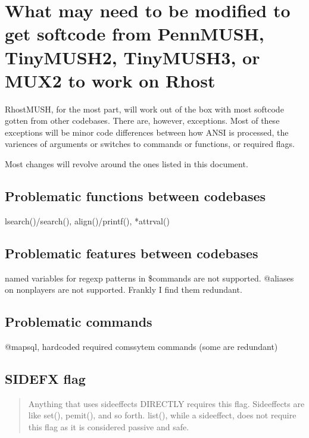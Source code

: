 \documentclass[letterpaper,10pt,english]{sphinxmanual}
\begin{document}
\section{What may need to be modified to get softcode from PennMUSH, TinyMUSH2, TinyMUSH3, or MUX2 to work on Rhost}
\label{\detokenize{differences:what-may-need-to-be-modified-to-get-softcode-from-pennmush-tinymush2-tinymush3-or-mux2-to-work-on-rhost}}
\sphinxAtStartPar
RhostMUSH, for the most part, will work out of the box with most softcode gotten
from other codebases.  There are, however, exceptions.  Most of these exceptions
will be minor code differences between how ANSI is processed, the variences
of arguments or switches to commands or functions, or required flags.

\sphinxAtStartPar
Most changes will revolve around the ones listed in this document.


\subsection{Problematic functions between codebases}
\label{\detokenize{differences:problematic-functions-between-codebases}}
\sphinxAtStartPar
lsearch()/search(), align()/printf(), *attrval()


\subsection{Problematic features between codebases}
\label{\detokenize{differences:problematic-features-between-codebases}}
\sphinxAtStartPar
named variables for regexp patterns in \$commands are not supported.
@aliases on non\sphinxhyphen{}players are not supported.  Frankly I find them redundant.


\subsection{Problematic commands}
\label{\detokenize{differences:problematic-commands}}
\sphinxAtStartPar
@mapsql, hardcoded required comssytem commands (some are redundant)


\subsection{SIDEFX flag}
\label{\detokenize{differences:sidefx-flag}}\begin{quote}

\sphinxAtStartPar
Anything that uses sideeffects \textendash{}DIRECTLY\textendash{} requires this flag.
Sideeffects are like set(), pemit(), and so forth.  list(), while a
side\sphinxhyphen{}effect, does not require this flag as it is considered passive and safe.
\end{quote}
\end{document}
